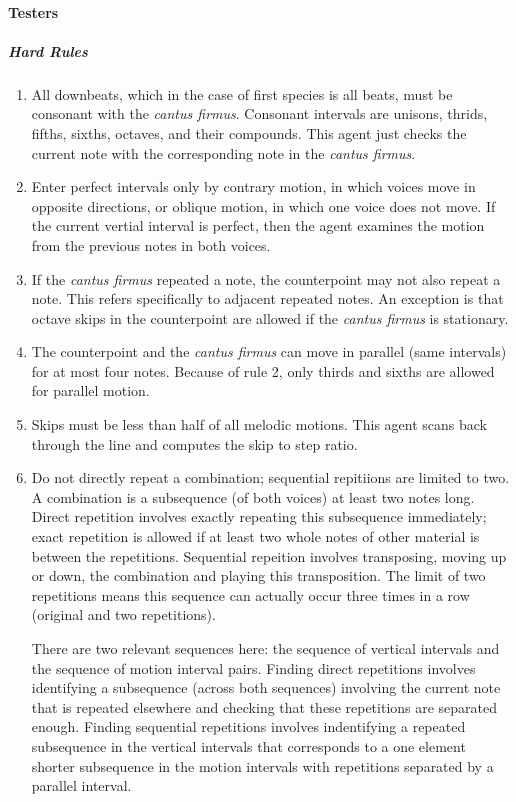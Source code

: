 \paragraph{Testers}
\subparagraph{Hard Rules}
	\begin{enumerate}
		\item All downbeats, which in the case of first species is all beats, must be consonant with the \emph{cantus firmus}. 
					Consonant intervals are unisons, thrids, fifths, sixths, octaves, and their compounds.
					This agent just checks the current note with the corresponding note in the \emph{cantus firmus}.

		\item Enter perfect intervals only by contrary motion, in which voices move in opposite directions, or oblique motion, in which one voice does not move.
					If the current vertial interval is perfect, then the agent examines the motion from the previous notes in both voices.

		\item If the \emph{cantus firmus} repeated a note, the counterpoint may not also repeat a note. This refers specifically to adjacent repeated notes.
					An exception is that octave skips in the counterpoint are allowed if the \emph{cantus firmus} is stationary.

		\item The counterpoint and the \emph{cantus firmus} can move in parallel (same intervals) for at most four notes. Because of rule 2, only thirds and sixths are allowed for parallel motion.

		\item Skips must be less than half of all melodic motions.
					This agent scans back through the line and computes the skip to step ratio.

		\item Do not directly repeat a combination; sequential repitiions are limited to two. A combination is a subsequence (of both voices) at least two notes long.
					Direct repetition involves exactly repeating this subsequence immediately; exact repetition is allowed if at least two whole notes of other material is between the repetitions.
					Sequential repeition involves transposing, moving up or down, the combination and playing this transposition. 
					The limit of two repetitions means this sequence can actually occur three times in a row (original and two repetitions).

					There are two relevant sequences here: the sequence of vertical intervals and the sequence of motion interval pairs. 
					Finding direct repetitions involves identifying a subsequence (across both sequences) involving the current note that is repeated elsewhere and checking that these repetitions are separated enough.
					Finding sequential repetitions involves indentifying a repeated subsequence in the vertical intervals that corresponds to a one element shorter subsequence in the motion intervals with repetitions
						separated by a parallel interval.


\end{enumerate}
